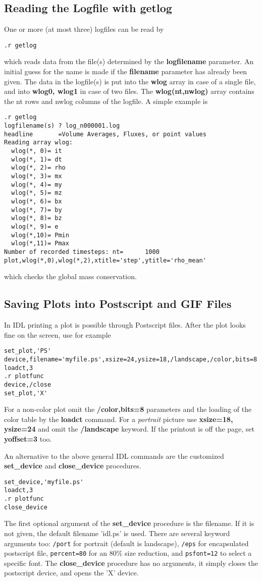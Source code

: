 \subsection{Reading the Logfile with getlog \label{s-getlog}}

One or more (at most three) logfiles can be read by
\begin{verbatim}
.r getlog
\end{verbatim}
   which reads data from the file(s) determined by the {\bf logfilename} 
   parameter. An initial guess for the name is made if the 
   {\bf filename} parameter has already been given. The data in the
   logfile(s) is put into the {\bf wlog} array in case of 
   a single file, and into {\bf wlog0, wlog1} in case of two files.
   The {\bf wlog(nt,nwlog)} array contains the nt rows and nwlog columns of the
   logfile. A simple example is 
\begin{verbatim}
.r getlog
logfilename(s) ? log_n000001.log
headline       =Volume Averages, Fluxes, or point values
Reading array wlog:
  wlog(*, 0)= it
  wlog(*, 1)= dt
  wlog(*, 2)= rho
  wlog(*, 3)= mx
  wlog(*, 4)= my
  wlog(*, 5)= mz
  wlog(*, 6)= bx
  wlog(*, 7)= by
  wlog(*, 8)= bz
  wlog(*, 9)= e
  wlog(*,10)= Pmin
  wlog(*,11)= Pmax
Number of recorded timesteps: nt=      1000
plot,wlog(*,0),wlog(*,2),xtitle='step',ytitle='rho_mean'
\end{verbatim}
which checks the global mass conservation.

\subsection{Saving Plots into Postscript and GIF Files \label{s-postscript}}

In IDL printing a plot is possible through Postscript files.
After the plot looks fine on the screen, use for example
\begin{verbatim}
set_plot,'PS'
device,filename='myfile.ps',xsize=24,ysize=18,/landscape,/color,bits=8
loadct,3
.r plotfunc
device,/close
set_plot,'X'
\end{verbatim}
For a non-color plot omit the {\bf /color,bits=8} parameters and the 
loading of the color table by the {\bf loadct} command. For a {\it portrait}
picture use {\bf xsize=18, ysize=24} and omit the {\bf /landscape} keyword.
If the printout is off the page, set {\bf yoffset=3} too.

An alternative to the above general IDL commands are  
the customized {\bf set\_device} and {\bf close\_device} procedures.
\begin{verbatim}
set_device,'myfile.ps'
loadct,3
.r plotfunc
close_device
\end{verbatim}
The first optional argument of the {\bf set\_device} procedure is the filename.
If it is not given, the default filename 'idl.ps' is used.
There are several keyword arguments too: {\tt /port} for
portrait (default is landscape), {\tt /eps} for encapsulated postscript
file, {\tt percent=80} for an 80\% size reduction, and {\tt psfont=12}
to select a specific font. The {\bf close\_device} procedure
has no arguments, it simply closes the postscript device, and opens the
'X' device.

